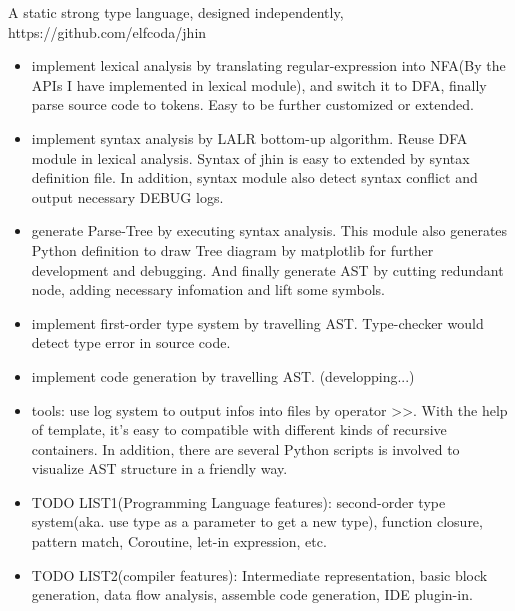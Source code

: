 \documentclass{resume}
\begin{document}
A static strong type language, designed independently, https://github.com/elfcoda/jhin
\begin{itemize}
  \item implement lexical analysis by translating regular-expression into NFA(By the APIs I have implemented in lexical module), and switch it to DFA, finally parse source code to tokens. Easy to be further customized or extended.
  \item implement syntax analysis by LALR bottom-up algorithm. Reuse DFA module in lexical analysis. Syntax of jhin is easy to extended by syntax definition file. In addition, syntax module also detect syntax conflict and output necessary DEBUG logs.
  \item generate Parse-Tree by executing syntax analysis. This module also generates Python definition to draw Tree diagram by matplotlib for further development and debugging. And finally generate AST by cutting redundant node, adding necessary infomation and lift some symbols.
  \item implement first-order type system by travelling AST. Type-checker would detect type error in source code.
  \item implement code generation by travelling AST. (developping...)
  \item tools: use log system to output infos into files by operator >>. With the help of template, it's easy to compatible with different kinds of recursive containers. In addition, there are several Python scripts is involved to visualize AST structure in a friendly way.
  \item TODO LIST1(Programming Language features): second-order type system(aka. use type as a parameter to get a new type), function closure, pattern match, Coroutine, let-in expression, etc.
  \item TODO LIST2(compiler features): Intermediate representation, basic block generation, data flow analysis, assemble code generation, IDE plugin-in.
\end{itemize}

\end{document}
